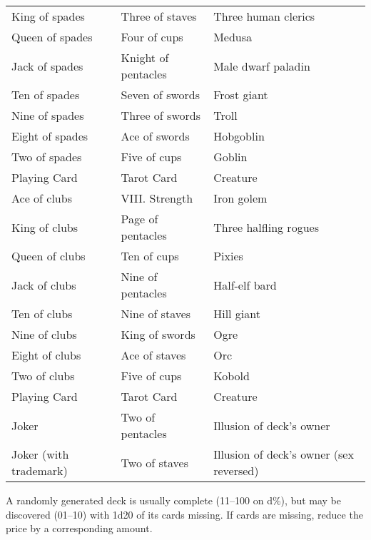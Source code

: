 \begin{tabular}{lll}
King of spades         & Three of staves        & Three human clerics                     \\
Queen of spades        & Four of cups           & Medusa                                  \\
Jack of spades         & Knight of pentacles    & Male dwarf paladin                      \\
Ten of spades          & Seven of swords        & Frost giant                             \\
Nine of spades         & Three of swords        & Troll                                   \\
Eight of spades        & Ace of swords          & Hobgoblin                               \\
Two of spades          & Five of cups           & Goblin                                  \\
Playing Card           & Tarot Card             & Creature                                \\
Ace of clubs           & VIII. Strength         & Iron golem                              \\
King of clubs          & Page of pentacles      & Three halfling rogues                   \\
Queen of clubs         & Ten of cups            & Pixies                                  \\
Jack of clubs          & Nine of pentacles      & Half-elf bard                           \\
Ten of clubs           & Nine of staves         & Hill giant                              \\
Nine of clubs          & King of swords         & Ogre                                    \\
Eight of clubs         & Ace of staves          & Orc                                     \\
Two of clubs           & Five of cups           & Kobold                                  \\
Playing Card           & Tarot Card             & Creature                                \\
Joker                  & Two of pentacles       & Illusion of deck's owner                \\
Joker (with trademark) & Two of staves          & Illusion of deck's owner (sex reversed)
\end{tabular}				
A randomly generated deck is usually complete (11--100 on d\%), but may be discovered (01--10) with 1d20 of its cards missing. If cards are missing, reduce the price by a corresponding amount. 
				
